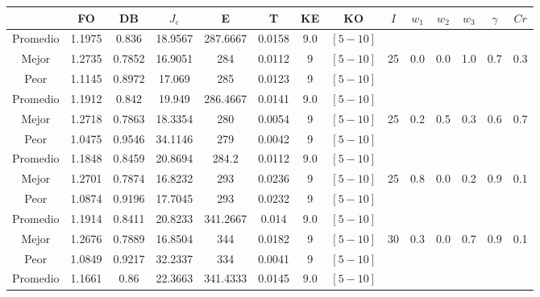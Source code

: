 \begin{table}[h!]
    \footnotesize
    \begin{center}
        \begin{tabular}{|c|c|c|c|c|c|c|c|c|c|c|c|c|c|}
        \hline
            & {\bf FO} & {\bf DB} & $J_e$ & {\bf E} & {\bf T} & {\bf KE} & {\bf KO} & $I$ & $w_1$ & $w_2$ & $w_3$ & $\gamma$ & $Cr$ \\
        \hline
        \hline
            Promedio  & 1.1975 & 0.836 & 18.9567 & 287.6667 & 0.0158 & 9.0 & $[5-10]$ &  &  &  &  &  & \\
            \cline{1-8}
            Mejor & 1.2735 & 0.7852  & 16.9051 & 284 & 0.0112 & 9 & $[5-10]$ & 25 & 0.0 & 0.0 & 1.0 & 0.7 & 0.3\\
            \cline{1-8}
            Peor & 1.1145 & 0.8972  & 17.069 & 285 & 0.0123 & 9 & $[5-10]$ &  &  &  &  &  & \\
        \hline
        \hline
            Promedio  & 1.1912 & 0.842 & 19.949 & 286.4667 & 0.0141 & 9.0 & $[5-10]$ &  &  &  &  &  & \\
            \cline{1-8}
            Mejor & 1.2718 & 0.7863  & 18.3354 & 280 & 0.0054 & 9 & $[5-10]$ & 25 & 0.2 & 0.5 & 0.3 & 0.6 & 0.7\\
            \cline{1-8}
            Peor & 1.0475 & 0.9546  & 34.1146 & 279 & 0.0042 & 9 & $[5-10]$ &  &  &  &  &  & \\
        \hline
        \hline
            Promedio  & 1.1848 & 0.8459 & 20.8694 & 284.2 & 0.0112 & 9.0 & $[5-10]$ &  &  &  &  &  & \\
            \cline{1-8}
            Mejor & 1.2701 & 0.7874  & 16.8232 & 293 & 0.0236 & 9 & $[5-10]$ & 25 & 0.8 & 0.0 & 0.2 & 0.9 & 0.1\\
            \cline{1-8}
            Peor & 1.0874 & 0.9196  & 17.7045 & 293 & 0.0232 & 9 & $[5-10]$ &  &  &  &  &  & \\
        \hline
        \hline
            Promedio  & 1.1914 & 0.8411 & 20.8233 & 341.2667 & 0.014 & 9.0 & $[5-10]$ &  &  &  &  &  & \\
            \cline{1-8}
            Mejor & 1.2676 & 0.7889  & 16.8504 & 344 & 0.0182 & 9 & $[5-10]$ & 30 & 0.3 & 0.0 & 0.7 & 0.9 & 0.1\\
            \cline{1-8}
            Peor & 1.0849 & 0.9217  & 32.2337 & 334 & 0.0041 & 9 & $[5-10]$ &  &  &  &  &  & \\
        \hline
        \hline
            Promedio  & 1.1661 & 0.86 & 22.3663 & 341.4333 & 0.0145 & 9.0 & $[5-10]$ &  &  &  &  &  & \\

\end{tabular}
\end{center}
\end{table}
